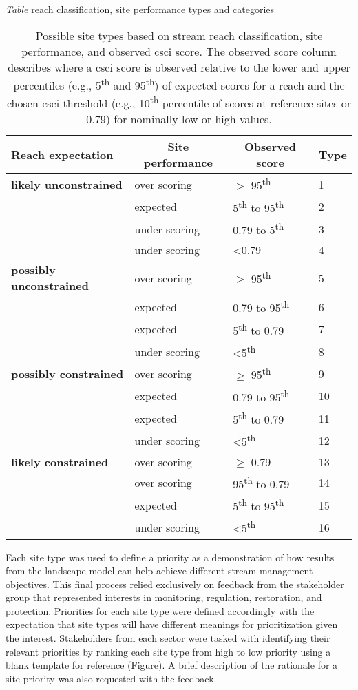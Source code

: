 \documentclass[]{article}
\begin{document}
\emph{Table} reach classification, site performance types and categories

\begin{table}[!tbp]
\caption{Possible site types based on stream reach classification, site performance, and observed \ac{csci} score. The observed score column describes where a \ac{csci} score is observed relative to the lower and upper percentiles (e.g., 5\textsuperscript{th} and 95\textsuperscript{th}) of expected scores for a reach and the chosen \ac{csci} threshold (e.g., 10\textsuperscript{th} percentile of scores at reference sites or 0.79) for nominally low or high values.\label{tab:typetab}} 
\begin{center}
\begin{tabular}{llll}
\hline\hline
\multicolumn{1}{l}{Reach expectation}&\multicolumn{1}{c}{Site performance}&\multicolumn{1}{c}{Observed score}&\multicolumn{1}{c}{Type}\tabularnewline
\hline
\textbf{likely unconstrained}&over scoring&$\geq$ 95\textsuperscript{th}&1\tabularnewline
&expected&5\textsuperscript{th} to 95\textsuperscript{th}&2\tabularnewline
&under scoring&0.79 to 5\textsuperscript{th}&3\tabularnewline
&under scoring&\textless  0.79&4\tabularnewline
\textbf{possibly unconstrained}&over scoring&$\geq$ 95\textsuperscript{th}&5\tabularnewline
&expected&0.79 to 95\textsuperscript{th}&6\tabularnewline
&expected&5\textsuperscript{th} to 0.79&7\tabularnewline
&under scoring&\textless  5\textsuperscript{th}&8\tabularnewline
\textbf{possibly constrained}&over scoring&$\geq$ 95\textsuperscript{th}&9\tabularnewline
&expected&0.79 to 95\textsuperscript{th}&10\tabularnewline
&expected&5\textsuperscript{th} to 0.79&11\tabularnewline
&under scoring&\textless  5\textsuperscript{th}&12\tabularnewline
\textbf{likely constrained}&over scoring&$\geq$ 0.79&13\tabularnewline
&over scoring&95\textsuperscript{th} to 0.79&14\tabularnewline
&expected&5\textsuperscript{th} to 95\textsuperscript{th}&15\tabularnewline
&under scoring&\textless  5\textsuperscript{th}&16\tabularnewline
\hline
\end{tabular}\end{center}
\end{table}

Each site type was used to define a priority as a demonstration of how
results from the landscape model can help achieve different stream
management objectives. This final process relied exclusively on feedback
from the stakeholder group that represented interests in monitoring,
regulation, restoration, and protection. Priorities for each site type
were defined accordingly with the expectation that site types will have
different meanings for prioritization given the interest. Stakeholders
from each sector were tasked with identifying their relevant priorities
by ranking each site type from high to low priority using a blank
template for reference (Figure). A brief description of the rationale
for a site priority was also requested with the feedback.
\end{document}
